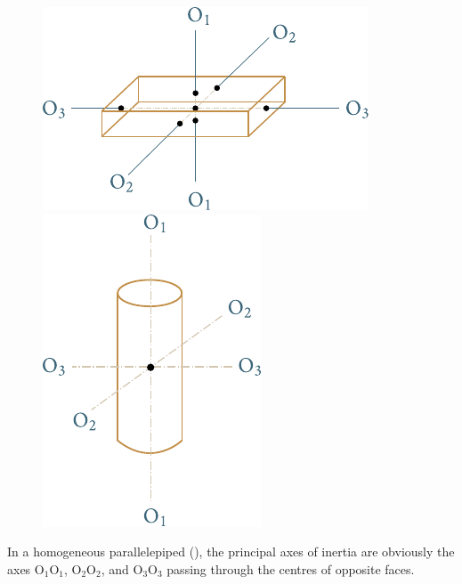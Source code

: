 \begin{figure}[t]
	\begin{minipage}[t]{0.5\linewidth}
		\begin{center}
			\includegraphics[scale=0.98]{figures/ch_05/fig_5_8.pdf}
			\caption[]{}
			\label{fig:5_8}
		\end{center}
	\end{minipage}
	\hspace{-0.05cm}
	\begin{minipage}[t]{0.5\linewidth}
		\begin{center}
			\includegraphics[scale=0.95]{figures/ch_05/fig_5_9.pdf}
			\caption[]{}
			\label{fig:5_9}
		\end{center}
	\end{minipage}
\vspace{-0.7cm}
\end{figure}

In a homogeneous parallelepiped (), the principal axes of inertia are obviously the axes O$_1$O$_1$, O$_2$O$_2$, and O$_3$O$_3$ passing through the centres of opposite faces.


